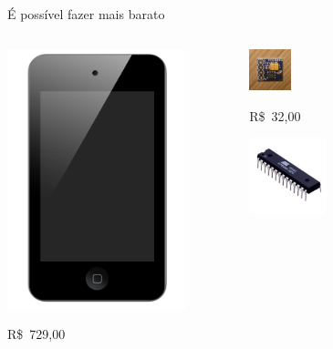 \documentclass{beamer}
\begin{document}
\begin{frame}{É possível fazer mais barato}
	\begin{columns}
		\pause
		\begin{center}
			\includegraphics[width=0.8\textwidth]{img/IPod_touch_4G.png}

			R\$~729,00
		\end{center}

		\pause
		\begin{center}
			\includegraphics[width=0.19\textwidth]{../monografia/img/sensor_front.jpg}

			R\$~32,00

			\pause
			\includegraphics[width=0.35\textwidth]{img/ATmega8.jpg}


\end{center}
\end{columns}
\end{frame}
\end{document}
